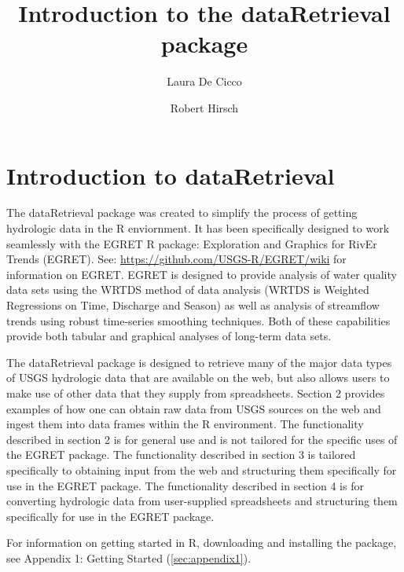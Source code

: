 \documentclass[a4paper,11pt]{article}
\begin{document}


\title{Introduction to the dataRetrieval package}
\author[1]{Laura De Cicco}
\author[1]{Robert Hirsch}



\maketitle
\tableofcontents

\section{Introduction to dataRetrieval}
The dataRetrieval package was created to simplify the process of getting hydrologic data in the R enviornment. It has been specifically designed to work seamlessly with the EGRET R package: Exploration and Graphics for RivEr Trends (EGRET). See: \url{https://github.com/USGS-R/EGRET/wiki} for information on EGRET. EGRET is designed to provide analysis of water quality data sets using the WRTDS method of data analysis (WRTDS is Weighted Regressions on Time, Discharge and Season) as well as analysis of streamflow trends using robust time-series smoothing techniques.  Both of these capabilities provide both tabular and graphical analyses of long-term data sets.


The dataRetrieval package is designed to retrieve many of the major data types of USGS hydrologic data that are available on the web, but also allows users to make use of other data that they supply from spreadsheets.  Section 2 provides examples of how one can obtain raw data from USGS sources on the web and ingest them into data frames within the R environment.  The functionality described in section 2 is for general use and is not tailored for the specific uses of the EGRET package.  The functionality described in section 3 is tailored specifically to obtaining input from the web and structuring them specifically for use in the EGRET package.  The functionality described in section 4 is for converting hydrologic data from user-supplied spreadsheets and structuring them specifically for use in the EGRET package.

For information on getting started in R, downloading and installing the package, see Appendix 1: Getting Started (\ref{sec:appendix1}).
\end{document}
